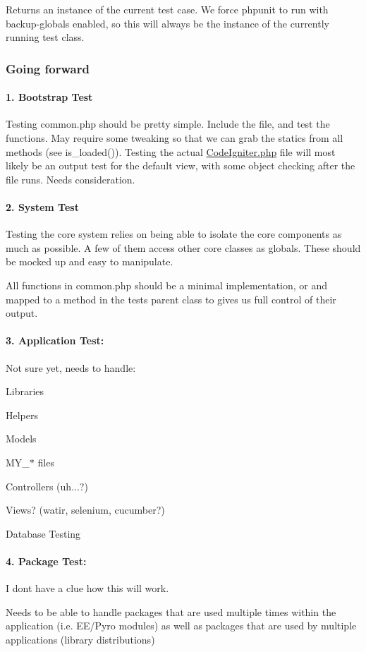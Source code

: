 Returns an instance of the current test case. We force phpunit to run with backup-\/globals enabled, so this will always be the instance of the currently running test class.

\subsubsection*{Going forward}

\paragraph*{1. Bootstrap Test}

Testing common.\+php should be pretty simple. Include the file, and test the functions. May require some tweaking so that we can grab the statics from all methods (see is\+\_\+loaded()). Testing the actual \hyperlink{_code_igniter_8php}{Code\+Igniter.\+php} file will most likely be an output test for the default view, with some object checking after the file runs. Needs consideration.

\paragraph*{2. System Test}

Testing the core system relies on being able to isolate the core components as much as possible. A few of them access other core classes as globals. These should be mocked up and easy to manipulate.

All functions in common.\+php should be a minimal implementation, or and mapped to a method in the test\textquotesingle{}s parent class to gives us full control of their output.

\paragraph*{3. Application Test\+:}

Not sure yet, needs to handle\+:


\begin{DoxyItemize}
\item Libraries
\item Helpers
\item Models
\item M\+Y\+\_\+$\ast$ files
\item Controllers (uh...?)
\item Views? (watir, selenium, cucumber?)
\item Database Testing
\end{DoxyItemize}

\paragraph*{4. Package Test\+:}

I don\textquotesingle{}t have a clue how this will work.

Needs to be able to handle packages that are used multiple times within the application (i.\+e. E\+E/\+Pyro modules) as well as packages that are used by multiple applications (library distributions) 